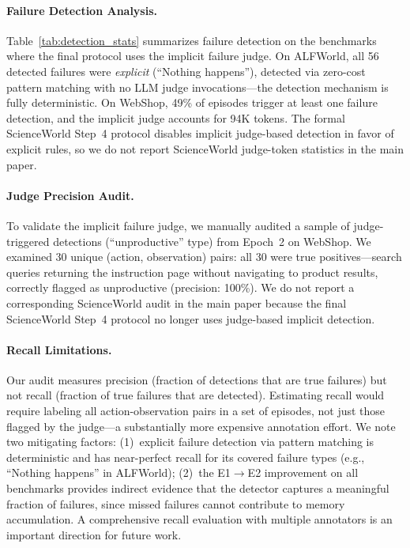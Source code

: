 \paragraph{Failure Detection Analysis.} Table~\ref{tab:detection_stats} summarizes failure detection on the benchmarks where the final protocol uses the implicit failure judge. On ALFWorld, all 56 detected failures were \emph{explicit} (``Nothing happens''), detected via zero-cost pattern matching with no LLM judge invocations---the detection mechanism is fully deterministic. On WebShop, 49\% of episodes trigger at least one failure detection, and the implicit judge accounts for 94K tokens. The formal ScienceWorld Step~4 protocol disables implicit judge-based detection in favor of explicit rules, so we do not report ScienceWorld judge-token statistics in the main paper.

\paragraph{Judge Precision Audit.} To validate the implicit failure judge, we manually audited a sample of judge-triggered detections (``unproductive'' type) from Epoch~2 on WebShop. We examined 30 unique (action, observation) pairs: all 30 were true positives---search queries returning the instruction page without navigating to product results, correctly flagged as unproductive (precision: 100\%). We do not report a corresponding ScienceWorld audit in the main paper because the final ScienceWorld Step~4 protocol no longer uses judge-based implicit detection.

\paragraph{Recall Limitations.} Our audit measures precision (fraction of detections that are true failures) but not recall (fraction of true failures that are detected). Estimating recall would require labeling all action-observation pairs in a set of episodes, not just those flagged by the judge---a substantially more expensive annotation effort. We note two mitigating factors: (1)~explicit failure detection via pattern matching is deterministic and has near-perfect recall for its covered failure types (e.g., ``Nothing happens'' in ALFWorld); (2)~the E1$\to$E2 improvement on all benchmarks provides indirect evidence that the detector captures a meaningful fraction of failures, since missed failures cannot contribute to memory accumulation. A comprehensive recall evaluation with multiple annotators is an important direction for future work.

